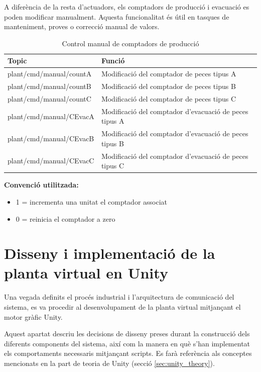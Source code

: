 \documentclass[a4paper,11pt,DIV=13,headings=normal,abstract=true,twoside=semi]{article}
\begin{document}
A diferència de la resta d'actuadors, els comptadors de producció i evacuació es poden modificar manualment. Aquesta funcionalitat és útil en tasques de manteniment, proves o correcció manual de valors.


\begin{table}[H]
\centering
\small
\caption{Control manual de comptadors de producció}
\label{tab:mqtt_manual_counters}
\begin{tabular}{|p{6cm}|p{7cm}|}
\hline
\textbf{Topic} & \textbf{Funció} \\ \hline

plant/cmd/manual/countA & Modificació del comptador de peces tipus A \\ \hline

plant/cmd/manual/countB & Modificació del comptador de peces tipus B \\ \hline

plant/cmd/manual/countC & Modificació del comptador de peces tipus C \\ \hline

plant/cmd/manual/CEvacA & Modificació del comptador d'evacuació de peces tipus A \\ \hline

plant/cmd/manual/CEvacB & Modificació del comptador d'evacuació de peces tipus B \\ \hline

plant/cmd/manual/CEvacC & Modificació del comptador d'evacuació de peces tipus C \\ \hline
\end{tabular}
\end{table}

\textbf{Convenció utilitzada:}

\begin{itemize}
\item 1 = incrementa una unitat el comptador associat
\item 0 = reinicia el comptador a zero
\end{itemize}


\newpage
\section{Disseny i implementació de la planta virtual en Unity}

Una vegada definits el procés industrial i l'arquitectura de comunicació del sistema, es va procedir al desenvolupament de la planta virtual mitjançant el motor gràfic Unity.

Aquest apartat descriu les decisions de disseny preses durant la construcció dels diferents components del sistema, així com la manera en què s'han implementat els comportaments necessaris mitjançant scripts. Es farà referència als conceptes mencionats en la part de teoria de Unity (secció \ref{sec:unity_theory}).
\end{document}
